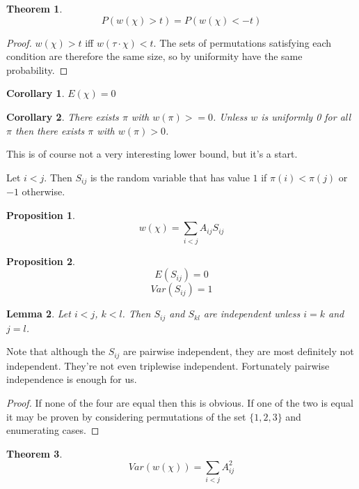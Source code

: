 \documentclass[a4paper,10pt]{article}
\newtheorem{prop}{Proposition}
\newtheorem{theorem}{Theorem}
\newtheorem{lemma}[theorem]{Lemma}
\newtheorem{corollary}{Corollary}[theorem]
\begin{document}
\begin{theorem}
\[ P(w(\chi) > t) = P(w(\chi) < -t) \]
\end{theorem}

\begin{proof}
$w(\chi) > t$ iff $w(\tau \cdot \chi) < t$. The sets of permutations satisfying each condition are therefore the same size, so by uniformity have the same probability.
\end{proof}

\begin{corollary}
$E(\chi) = 0$
\end{corollary}

\begin{corollary}
There exists $\pi$ with $w(\pi) >= 0$. Unless $w$ is uniformly 0 for all $\pi$ then there exists $\pi$ with $w(\pi) > 0$.
\end{corollary}

This is of course not a very interesting lower bound, but it's a start.

Let $i < j$. Then $S_{ij}$ is the random variable that has value $1$ if $\pi(i) < \pi(j)$ or $-1$ otherwise.

\begin{prop}
  \[ w(\chi) = \sum_{i < j} A_{ij} S_{ij} \]
\end{prop}

\begin{prop}
\[ E(S_{ij}) = 0 \]
\[ Var(S_{ij}) = 1 \]

\end{prop}

\begin{lemma}
Let $i < j$, $k < l$. Then $S_{ij}$ and $S_{kl}$ are independent unless $i = k$ and $j = l$. 
\end{lemma}

Note that although the $S_{ij}$ are pairwise independent, they are most definitely not independent. They're not even triplewise independent. Fortunately pairwise independence is enough for us.

\begin{proof}
If none of the four are equal then this is obvious. If one of the two is equal it may be proven by considering permutations of the set $\{1, 2, 3\}$ and enumerating cases.
\end{proof}


\begin{theorem}
\[ Var(w(\chi)) = \sum_{i < j} A_{ij}^2 \]
\end{theorem}
\end{document}
